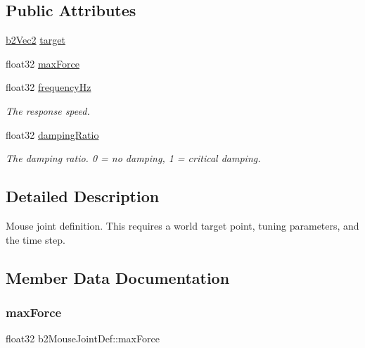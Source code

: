 \subsection*{Public Attributes}
\begin{DoxyCompactItemize}
\item 
\hyperlink{structb2Vec2}{b2\+Vec2} \hyperlink{structb2MouseJointDef_aa1b76f72df9aca8d42bdc3e9922e310a}{target}
\item 
float32 \hyperlink{structb2MouseJointDef_ae9c52b3afda8ed006eb62fad163cdc3b}{max\+Force}
\item 
\mbox{\label{structb2MouseJointDef_a61e9017eb928608f75edddb6e0ca7f63}} 
float32 \hyperlink{structb2MouseJointDef_a61e9017eb928608f75edddb6e0ca7f63}{frequency\+Hz}
\begin{DoxyCompactList}\small\item\em The response speed. \end{DoxyCompactList}\item 
\mbox{\label{structb2MouseJointDef_aee42888dab204a5c5745ba61acbfb7d6}} 
float32 \hyperlink{structb2MouseJointDef_aee42888dab204a5c5745ba61acbfb7d6}{damping\+Ratio}
\begin{DoxyCompactList}\small\item\em The damping ratio. 0 = no damping, 1 = critical damping. \end{DoxyCompactList}\end{DoxyCompactItemize}


\subsection{Detailed Description}
Mouse joint definition. This requires a world target point, tuning parameters, and the time step. 

\subsection{Member Data Documentation}
\mbox{\label{structb2MouseJointDef_ae9c52b3afda8ed006eb62fad163cdc3b}} 
\subsubsection{\texorpdfstring{max\+Force}{maxForce}}
{\footnotesize\ttfamily float32 b2\+Mouse\+Joint\+Def\+::max\+Force}

